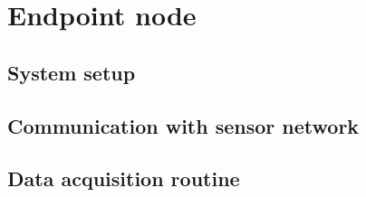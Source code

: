 \chapter{Endpoint node}

\section{System setup}
\section{Communication with sensor network}
\section{Data acquisition routine}
